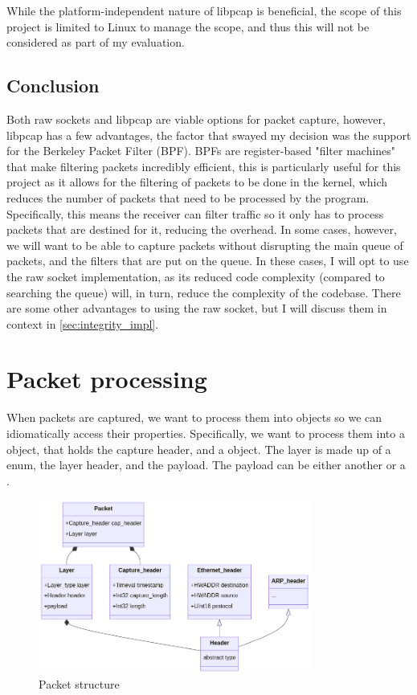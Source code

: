 While the platform-independent nature of libpcap is beneficial, the scope of this project is limited to Linux to manage the scope, and thus this will not be considered as part of my evaluation.

\subsection{Conclusion}

Both raw sockets and libpcap are viable options for packet capture, however, libpcap has a few advantages, the factor that swayed my decision was the support for the Berkeley Packet Filter (BPF). BPFs are register-based "filter machines" \citep{BPF} that make filtering packets incredibly efficient, this is particularly useful for this project as it allows for the filtering of packets to be done in the kernel, which reduces the number of packets that need to be processed by the program. Specifically, this means the receiver can filter traffic so it only has to process packets that are destined for it, reducing the overhead. In some cases, however, we will want to be able to capture packets without disrupting the main queue of packets, and the filters that are put on the queue. In these cases, I will opt to use the raw socket implementation, as its reduced code complexity (compared to searching the queue) will, in turn, reduce the complexity of the codebase. There are some other advantages to using the raw socket, but I will discuss them in context in \ref{sec:integrity_impl}.

\section{Packet processing}
\label{sec:packet_processing}

When packets are captured, we want to process them into objects so we can idiomatically access their properties. Specifically, we want to process them into a  object, that holds the capture header, and a  object. The layer is made up of a  enum, the layer header, and the payload. The payload can be either another  or a .

\begin{figure}[!h]
    \centering
    \includegraphics[width=0.8\textwidth]{fig/packet_structure.png}
    \caption{Packet structure}
    \label{fig:packet_structure}
\end{figure}

